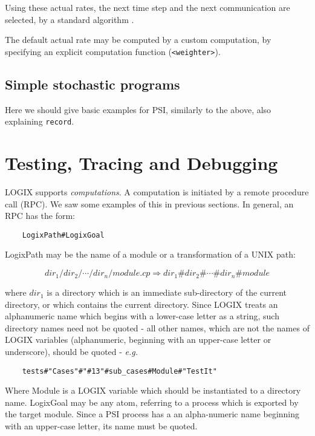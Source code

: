Using these actual rates, the next time step and the next
communication are selected, by a standard algorithm \cite{Gil77}.

The default actual rate may be computed by a custom computation,
by specifying an explicit computation function (\verb+<weighter>+).

\section{Simple stochastic programs}

Here we should give basic examples for PSI, similarly to
the above, also explaining \verb+record+.


\chapter{Testing, Tracing and Debugging}
\label{debug}

LOGIX supports {\em computations}.  A computation is initiated by
a remote procedure call (RPC).  We saw some examples of this in
previous sections.  In general, an RPC has the form:

\begin{verbatim}
    LogixPath#LogixGoal
\end{verbatim}

\noindent
LogixPath may be the name of a module or a transformation of a UNIX path:

\[dir_{1}/dir_{2}/ \cdots /dir_{n}/module.cp  \Rightarrow  dir_{1}\#dir_{2}\# \cdots \#dir_{n}\#module\]

\noindent
where $dir_{1}$ is a directory which is an immediate sub-directory
of the current directory, or which contains the current directory.
Since LOGIX treats an alphanumeric name which begins with a lower-case
letter as a string, such directory names need not be quoted - all
other names, which are not the names of LOGIX variables (alphanumeric,
beginning with an upper-case letter or underscore), should be quoted -
{\em e.g.}

\begin{verbatim}
    tests#"Cases"#"#13"#sub_cases#Module#"TestIt"
\end{verbatim}

Where Module is a LOGIX variable which should be instantiated to a
directory name.
\noindent
LogixGoal may be any atom, referring to a process which is exported by
the target module.  Since a PSI process has a an alpha-numeric name
beginning with an upper-case letter, its name must be quoted.

